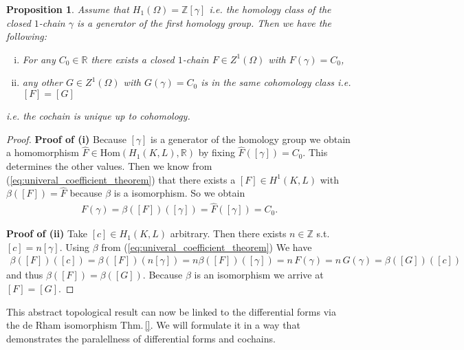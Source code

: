 \documentclass[12pt,a4paper]{article}
\numberwithin{equation}{subsection}
\numberwithin{lemma}{subsection}
\newtheorem{proposition}[lemma]{Proposition}
\theoremstyle{definition}
\newcommand{\integers}{\mathbb{Z}}
\newcommand{\real}{\mathbb{R}}
\begin{document}
\begin{proposition}\label{prop:uniqueness_cochain}
    Assume that $H_1(\Omega) = \integers [\gamma]$ i.e. the homology 
    class of the 
    closed $1$-chain $\gamma$ is a generator of the first homology group.
    Then we have the following:
    \begin{enumerate}[(i)]
        \item For any $C_0 \in \real$ there exists a closed $1$-chain 
            $F \in Z^1(\Omega)$ with $F(\gamma) = C_0$,
        \item any other $G \in Z^1(\Omega)$ with $G(\gamma) = C_0$ 
            is in the same cohomology class i.e. $[F] = [G]$
    \end{enumerate}
    i.e. the cochain is unique up to cohomology.
\end{proposition}
\begin{proof}
    \textbf{Proof of (i)} %
    Because $[\gamma]$ is a generator of the homology group we  obtain a 
    homomorphism $\hat{F} \in \text{Hom}(H_1(K,L),\real)$ by fixing
    $\hat{F}([\gamma]) = C_0$. This determines the other values.
    Then we know from (\ref{eq:univeral_coefficient_theorem}) that there exists
    a $[F] \in H^1(K,L)$ with $\beta([F]) = \hat{F}$ because $\beta$ is a 
    isomorphism. So we obtain
    \begin{align*}
        F(\gamma) = \beta([F])([\gamma]) = \hat{F}([\gamma]) = C_0.
    \end{align*}

    \textbf{Proof of (ii)} %
    Take $[c] \in H_1(K,L)$ arbitrary. Then there exists  $n \in \integers$ s.t.
    $[c] = n [\gamma]$.
    Using $\beta$ from (\ref{eq:univeral_coefficient_theorem})
    We have
    \begin{align*}
        \beta([F])([c]) = \beta([F])(n [\gamma]) 
        = n \beta([F])([\gamma]) = n \, F(\gamma) = n \, G(\gamma) = 
        \beta([G])([c])
    \end{align*}
    and thus $\beta([F]) = \beta([G])$. Because $\beta$ is an isomorphism
    we arrive at $[F] = [G]$.
\end{proof}
This abstract topological result can now be linked to the differential 
forms via the de Rham isomorphism Thm.\,\ref{}. We will formulate it in a way 
that demonstrates the paralellness of differential forms and cochains.
\end{document}
